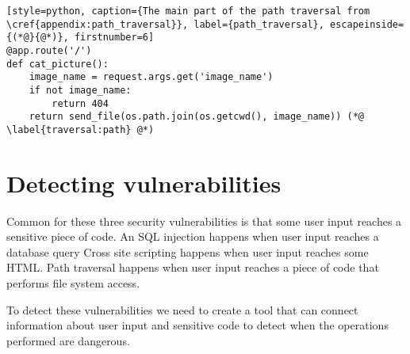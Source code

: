 \begin{lstlisting}[style=python, caption={The main part of the path traversal from \cref{appendix:path_traversal}}, label={path_traversal}, escapeinside={(*@}{@*)}, firstnumber=6]
@app.route('/')
def cat_picture():
    image_name = request.args.get('image_name')
    if not image_name:
        return 404
    return send_file(os.path.join(os.getcwd(), image_name)) (*@ \label{traversal:path} @*)

\end{lstlisting}

\section{Detecting vulnerabilities}\label{vulnerabilities:detecting}
Common for these three security vulnerabilities is that some user input reaches a sensitive piece of code.
An SQL injection happens when user input reaches a database query
Cross site scripting happens when user input reaches some HTML.
Path traversal happens when user input reaches a piece of code that performs file system access.

To detect these vulnerabilities we need to create a tool that can connect information about user input and sensitive code to detect when the operations performed are dangerous.
